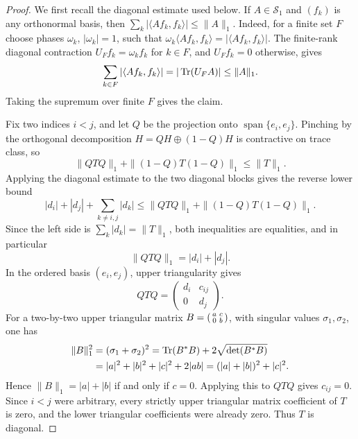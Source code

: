 \begin{proof}
  We first recall the diagonal estimate used below.  If \(A\in\mathcal S_1\)
  and \((f_k)\) is any orthonormal basis, then
  \(\sum_k|\langle Af_k,f_k\rangle|\le\|A\|_1\).  Indeed, for a finite set
  \(F\) choose phases \(\omega_k\), \(|\omega_k|=1\), such that
  \(\omega_k\langle Af_k,f_k\rangle=|\langle Af_k,f_k\rangle|\).  The finite-rank
  diagonal contraction \(U_F f_k=\omega_k f_k\) for \(k\in F\), and
  \(U_F f_k=0\) otherwise, gives
  \[
    \sum_{k\in F}|\langle Af_k,f_k\rangle|
    =|\operatorname{Tr}(U_FA)|\le\|A\|_1.
  \]
  Taking the supremum over finite \(F\) gives the claim.

  Fix two indices \(i<j\), and let \(Q\) be the projection onto
  \(\operatorname{span}\{e_i,e_j\}\).  Pinching by the orthogonal
  decomposition \(H=QH\oplus(1-Q)H\) is contractive on trace class, so
  \[
    \|QTQ\|_1+\|(1-Q)T(1-Q)\|_1\le\|T\|_1.
  \]
  Applying the diagonal estimate to the two diagonal blocks gives the reverse
  lower bound
  \[
    |d_i|+|d_j|+
    \sum_{k\ne i,j}|d_k|
    \le
    \|QTQ\|_1+\|(1-Q)T(1-Q)\|_1.
  \]
  Since the left side is \(\sum_k|d_k|=\|T\|_1\), both inequalities are
  equalities, and in particular
  \[
    \|QTQ\|_1=|d_i|+|d_j|.
  \]
  In the ordered basis \((e_i,e_j)\), upper triangularity gives
  \[
    QTQ=\begin{pmatrix}d_i&c_{ij}\\0&d_j\end{pmatrix}.
  \]
  For a two-by-two upper triangular matrix
  \(B=\begin{psmallmatrix}a&c\\0&b\end{psmallmatrix}\), with singular values
  \(\sigma_1,\sigma_2\), one has
  \[
  \begin{aligned}
    \|B\|_1^2
    &=(\sigma_1+\sigma_2)^2
      =\operatorname{Tr}(B^*B)+2\sqrt{\det(B^*B)} \\
    &=|a|^2+|b|^2+|c|^2+2|ab|
      =(|a|+|b|)^2+|c|^2 .
  \end{aligned}
  \]
  Hence \(\|B\|_1=|a|+|b|\) if and only if \(c=0\).  Applying this to
  \(QTQ\) gives \(c_{ij}=0\).  Since \(i<j\) were arbitrary, every strictly
  upper triangular matrix coefficient of \(T\) is zero, and the lower
  triangular coefficients were already zero.  Thus \(T\) is diagonal.
\end{proof}

